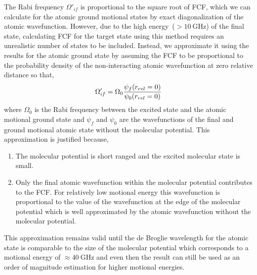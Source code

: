 The Rabi frequency $\Omega'_{if}$ is proportional to the square root of FCF,
which we can calculate for the atomic ground motional states by exact diagonalization
of the atomic wavefunction.
However, due to the high energy~($>\!10~\mathrm{GHz}$) of the final state,
calculating FCF for the target state using this method requires an unrealistic number of
states to be included.
Instead, we approximate it using the results for the atomic ground state
by assuming the FCF to be proportional to the probability density of the non-interacting
atomic wavefunction at zero relative distance so that,
\[
  \Omega'_{if}=\Omega_0\frac{\psi_f{\left({r_{rel}=0}\right)}}{\psi_0{\left({r_{rel}=0}\right)}}
\]
where $\Omega_0$ is the Rabi frequency between the excited state and
the atomic motional ground state and $\psi_f$ and $\psi_0$ are the
wavefunctions of the final and ground motional atomic state without the molecular potential.
This approximation is justified because,
\begin{enumerate}
\item The molecular potential is short ranged and the excited molecular state is small.
\item Only the final atomic wavefunction within the molecular potential contributes to the FCF.
  For relatively low motional energy
  this wavefunction is proportional to the value of the wavefunction at
  the edge of the molecular potential which is well approximated by
  the atomic wavefunction without the molecular potential.
\end{enumerate}
This approximation remains valid until the de Broglie wavelength for the atomic state
is comparable to the size of the molecular potential which corresponds to
a motional energy of $\approx\!40~\mathrm{GHz}$
and even then the result can still be used as an order of magnitude estimation
for higher motional energies.

